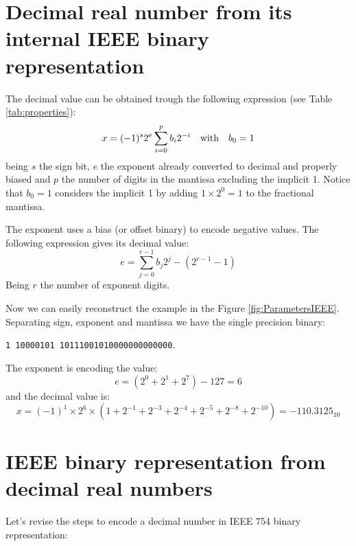     \section{Decimal real number from its internal IEEE binary representation}

The decimal value can be obtained trough the following expression (see Table \ref{tab:properties}):
$$
   x = (-1)^s  2^e  \sum_{i=0}^{p} b_i 2^{-i} \quad \textnormal{with}\quad b_0 = 1
$$
being $s$ the sign bit, $e$ the exponent already converted to decimal and properly biased and $p$ the number of digits in the mantissa excluding the implicit 1. 
Notice that $b_0 = 1$ considers the implicit 1 by adding $1\times2^0 = 1$ to the fractional mantissa. 



The exponent uses a bias (or offset binary) to encode negative values. The following expression gives its decimal value:
$$
e = \sum_{j=0}^{r-1} b_j 2^j - \left( 2^{r-1} - 1 \right)
$$
Being $r$ the number of exponent digits. 
 
 
Now we can easily reconstruct the example in the Figure \ref{fig:ParametersIEEE}. Separating sign, exponent and mantissa we have the single precision binary: 

\texttt{1 10000101 10111001010000000000000}. 

The exponent is encoding the value:
$$
e = ( 2^0 + 2^1 + 2^7 ) - 127 = 6
$$
and the decimal value is:
$$
x = (-1)^1 \times 2^6 \times ( 1 + 2^{-1} + 2^{-3} + 2^{-4} + 2^{-5} + 2^{-8} + 2^{-10} ) = -110.3125_{10}
$$





    \section{IEEE binary representation from decimal real numbers}

Let's revise the steps to encode a decimal number in IEEE 754 binary representation:

